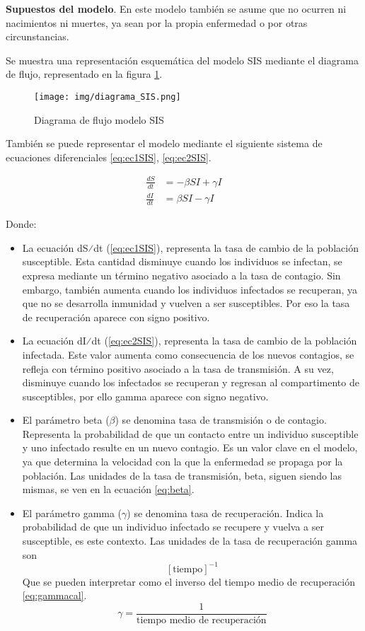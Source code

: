 \textbf{Supuestos del modelo}. En este modelo también se asume que no ocurren ni nacimientos ni muertes, ya sean por la propia enfermedad o por otras circunstancias.

Se muestra una representación esquemática del modelo SIS mediante el diagrama de flujo, representado en la figura \ref{fig:diagrama SIS}.
\begin{figure}[H]
    \centering
    \texttt{[image: img/diagrama\_SIS.png]}
    \caption{Diagrama de flujo modelo SIS}
    \label{fig:diagrama SIS}
    \vspace{0.5cm} %
\end{figure}

También se puede representar el modelo mediante el siguiente sistema de ecuaciones diferenciales \ref{eq:ec1SIS}, \ref{eq:ec2SIS}.

\begin{align}
\frac{dS}{dt} &= -\beta SI + \gamma I \label{eq:ec1SIS} \\
\frac{dI}{dt} &= \beta SI - \gamma I \label{eq:ec2SIS}
\end{align}

Donde:
\begin{itemize}
    \item 	La ecuación dS⁄dt (\ref{eq:ec1SIS}), representa la tasa de cambio de la población susceptible. Esta cantidad disminuye cuando los individuos se infectan, se expresa mediante un término negativo asociado a la tasa de contagio. Sin embargo, también aumenta cuando los individuos infectados se recuperan, ya que no se desarrolla inmunidad y vuelven a ser susceptibles. Por eso la tasa de recuperación aparece con signo positivo.
    \item 	La ecuación dI⁄dt (\ref{eq:ec2SIS}), representa la tasa de cambio de la población infectada. Este valor aumenta como consecuencia de los nuevos contagios, se refleja con término positivo asociado a la tasa de transmisión. A su vez, disminuye cuando los infectados se recuperan y regresan al compartimento de susceptibles, por ello gamma aparece con signo negativo.
    \item 	El parámetro beta ($\beta$) se denomina tasa de transmisión o de contagio. Representa la probabilidad de que un contacto entre un individuo susceptible y uno infectado resulte en un nuevo contagio. Es un valor clave en el modelo, ya que determina la velocidad con la que la enfermedad se propaga por la población. Las unidades de la tasa de transmisión, beta, siguen siendo las mismas, se ven en la ecuación \ref{eq:beta}.
    \item 	El parámetro gamma ($\gamma$) se denomina tasa de recuperación. Indica la probabilidad de que un individuo infectado se recupere y vuelva a ser susceptible, es este contexto. Las unidades de la tasa de recuperación gamma son \[[\text{tiempo}]^{-1}\] Que se pueden interpretar como el inverso del tiempo medio de recuperación \ref{eq:gammacal}.
    \begin{equation}
    \gamma = \frac{1}{\text{tiempo medio de recuperación}}
    \label{eq:gammacal}
    \end{equation}
\end{itemize}

